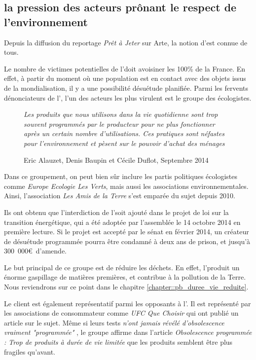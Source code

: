\subsection{la pression des acteurs prônant le respect de l'environnement }

Depuis la diffusion du reportage \textit{Prêt à Jeter} sur Arte, la notion d'\op est connue de tous. 

Le nombre de victimes potentielles de l'\op doit avoisiner les 100\% de la France. En effet, à partir du moment où une population est en contact avec des objets issus de la mondialisation, il y a une possibilité désuétude planifiée. 
Parmi les fervents dénonciateurs de l'\op, l'un des acteurs les plus virulent est le groupe des écologistes. 

\begin{wrapfigure}{r}{0.3\textwidth}
\vspace{-4mm}\og  \textit{Les produits que nous utilisons dans la vie quotidienne sont trop souvent programmés par le producteur pour ne plus fonctionner après un certain nombre d'utilisations. Ces pratiques sont néfastes pour l'environnement et pèsent sur le pouvoir d'achat des ménages} \fg{} \caption{Eric Alauzet, Denis Baupin et Cécile Duflot, Septembre 2014}
\end{wrapfigure}

Dans ce groupement, on peut bien sûr inclure les partis politiques écologistes  comme \textit{Europe Ecologie Les Verts}, mais aussi les associations environnementales. Ainsi, l'association \textit{Les Amis de la Terre} s'est emparée du sujet depuis 2010. 

Ils ont obtenu que l'interdiction de l'\op soit ajouté dans le projet de loi sur la transition énergétique, qui a été adoptée par l'assemblée le 14 octobre 2014 en première lecture. Si le projet est accepté par le sénat en février 2014, un créateur de désuétude programmée pourra être condamné à deux ans de prison, et jusqu'à 300~000\euro~d'amende. 

Le but principal de ce groupe est de réduire les déchets. En effet, l'\op produit un énorme gaspillage de matières premières, et contribue à la pollution de la Terre. Nous reviendrons sur ce point dans le chapitre \ref{chapter::pb_duree_vie_reduite}.

\medbreak
Le client est également représentatif parmi les opposants à l'\op. Il est  représenté par les associations de consommateur comme \textit{UFC Que Choisir} qui ont publié un article \cite{ufc_OP} sur le sujet. Même si leurs tests \og \textit{n'ont jamais révélé d’obsolescence vraiment "programmée" }  \fg{}  , le groupe affirme dans l'article \textit{Obsolescence programmée : Trop de produits à durée de vie limitée } que les produits semblent être plus fragiles qu'avant.


